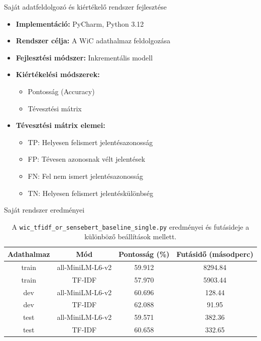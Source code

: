 \documentclass{beamer}
\begin{document}
    \begin{frame}{Saját adatfeldolgozó és kiértékelő rendszer fejlesztése}
        \begin{itemize}
            \item \textbf{Implementáció:} PyCharm, Python 3.12
            \item \textbf{Rendszer célja:} A WiC adathalmaz feldolgozása
            \item \textbf{Fejlesztési módszer:} Inkrementális modell
        \end{itemize}
        \begin{itemize}
            \item \textbf{Kiértékelési módszerek:}
            \begin{itemize}
                \item Pontosság (Accuracy)
                \item Tévesztési mátrix
            \end{itemize}
            \item \textbf{Tévesztési mátrix elemei:}
            \begin{itemize}
                \item TP: Helyesen felismert jelentésazonosság
                \item FP: Tévesen azonosnak vélt jelentések
                \item FN: Fel nem ismert jelentésazonosság
                \item TN: Helyesen felismert jelentéskülönbség
            \end{itemize}
        \end{itemize}
    \end{frame}



    \begin{frame}{Saját rendszer eredményei}
        \begin{table}[h]
            \centering
            \begin{tabular}{c|c|c|c}
                \hline
                Adathalmaz & Mód & Pontosság (\%) & Futásidő (másodperc) \\ \hline
                train & all-MiniLM-L6-v2 & 59.912 & 8294.84 \\ \hline
                train & TF-IDF & 57.970 & 5903.44 \\ \hline
                dev & all-MiniLM-L6-v2 & 60.696 & 128.44 \\ \hline
                dev & TF-IDF & 62.088 & 91.95 \\ \hline
                test & all-MiniLM-L6-v2 & 59.571 & 382.36 \\ \hline
                test & TF-IDF & 60.658 & 332.65 \\ \hline
            \end{tabular}
            \caption{A \texttt{wic\_tfidf\_or\_sensebert\_baseline\_single.py} eredményei és futásideje a különböző beállítások mellett.
            }
            \label{tab:my_label}
        \end{table}
    \end{frame}
\end{document}
